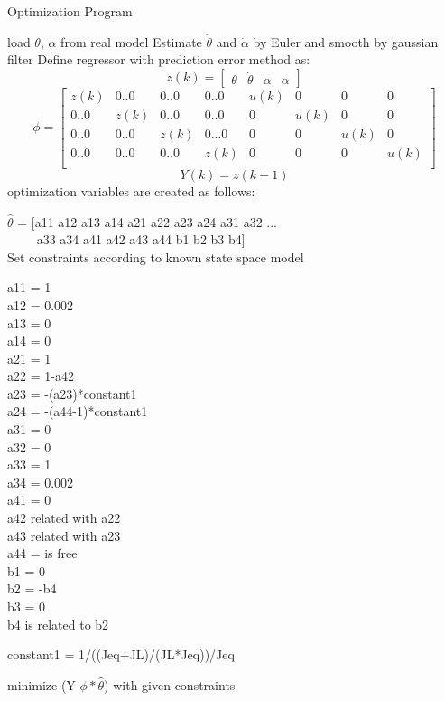         
\begin{algorithm}[ht]
\caption{Optimization Program}
\label{alp_optimization}
\begin{algorithmic}[1]
\STATE load $\theta$, $\alpha$  from real model 
\STATE Estimate $\dot\theta$ and $\dot\alpha$ by Euler and smooth by gaussian filter 
\STATE Define regressor with prediction error method as:\\
    \[
    z(k) =
       \begin{bmatrix}
        \theta & \dot\theta & \alpha & \dot\alpha
       \end{bmatrix}
       \]
   \[
   \phi = 
   \begin{bmatrix}
     z(k) & 0..0 & 0..0 &0..0 & u(k) & 0 & 0 & 0\\
     0..0 & z(k) & 0..0 &0..0 & 0& u(k) & 0 & 0\\
     0..0 & 0..0 & z(k) & 0...0 & 0 & 0 & u(k) & 0\\
     0..0 & 0..0 & 0..0 & z(k) & 0 &0 & 0 &  u(k)\\
    \end{bmatrix}
        \]
        \[
       Y(k) =   z(k+1) 
 \]
\STATE optimization variables are created as follows:

$\hat\theta$ = 
    [a11  a12  a13  a14  a21  a22  a23 a24  a31  a32 ...\\
$ $ $ $ $ $ $ $ $ $ $ $ $ $ $ $a33  a34 a41 a42 a43 a44 b1 b2 b3 b4]\\

\STATE Set constraints according to known state space model\\
\begin{multicols}{2}

a11 = 1\\
a12 = 0.002\\
a13 = 0\\
a14 = 0\\
a21 = 1\\
a22 = 1-a42\\
a23 = -(a23)*constant1\\
a24 = -(a44-1)*constant1\\
a31 = 0\\
a32 = 0\\
a33 = 1\\
a34 = 0.002\\
a41 = 0\\
a42 related with a22\\
a43 related with a23\\
a44 = is free\\
b1 = 0\\
b2 = -b4\\
b3 = 0\\
b4 is related to b2\\
\end{multicols}
constant1 = 1/((Jeq+JL)/(JL*Jeq))/Jeq

\STATE minimize (Y-$\phi*\hat\theta$) with given constraints

\end{algorithmic}
\end{algorithm}

